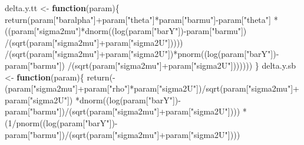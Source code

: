 \documentclass[
]{book}
\newenvironment{Shaded}{\begin{snugshade}}{\end{snugshade}}
\newcommand{\ControlFlowTok}[1]{\textcolor[rgb]{0.13,0.29,0.53}{\textbf{#1}}}
\newcommand{\DecValTok}[1]{\textcolor[rgb]{0.00,0.00,0.81}{#1}}
\newcommand{\FunctionTok}[1]{\textcolor[rgb]{0.00,0.00,0.00}{#1}}
\newcommand{\NormalTok}[1]{#1}
\newcommand{\OtherTok}[1]{\textcolor[rgb]{0.56,0.35,0.01}{#1}}
\newcommand{\SpecialCharTok}[1]{\textcolor[rgb]{0.00,0.00,0.00}{#1}}
\newcommand{\StringTok}[1]{\textcolor[rgb]{0.31,0.60,0.02}{#1}}
\theoremstyle{definition}
\theoremstyle{definition}
\theoremstyle{definition}
\theoremstyle{definition}
\theoremstyle{remark}
\begin{document}
\begin{Shaded}
\begin{Highlighting}[]
\NormalTok{delta.y.tt }\OtherTok{\textless{}{-}} \ControlFlowTok{function}\NormalTok{(param)\{}
  \FunctionTok{return}\NormalTok{(param[}\StringTok{"baralpha"}\NormalTok{]}\SpecialCharTok{+}\NormalTok{param[}\StringTok{"theta"}\NormalTok{]}\SpecialCharTok{*}\NormalTok{param[}\StringTok{"barmu"}\NormalTok{]}\SpecialCharTok{{-}}\NormalTok{param[}\StringTok{"theta"}\NormalTok{]}
         \SpecialCharTok{*}\NormalTok{((param[}\StringTok{"sigma2mu"}\NormalTok{]}\SpecialCharTok{*}\FunctionTok{dnorm}\NormalTok{((}\FunctionTok{log}\NormalTok{(param[}\StringTok{"barY"}\NormalTok{])}\SpecialCharTok{{-}}\NormalTok{param[}\StringTok{"barmu"}\NormalTok{])}
                                    \SpecialCharTok{/}\NormalTok{(}\FunctionTok{sqrt}\NormalTok{(param[}\StringTok{"sigma2mu"}\NormalTok{]}\SpecialCharTok{+}\NormalTok{param[}\StringTok{"sigma2U"}\NormalTok{]))))}
           \SpecialCharTok{/}\NormalTok{(}\FunctionTok{sqrt}\NormalTok{(param[}\StringTok{"sigma2mu"}\NormalTok{]}\SpecialCharTok{+}\NormalTok{param[}\StringTok{"sigma2U"}\NormalTok{])}\SpecialCharTok{*}\FunctionTok{pnorm}\NormalTok{((}\FunctionTok{log}\NormalTok{(param[}\StringTok{"barY"}\NormalTok{])}\SpecialCharTok{{-}}\NormalTok{param[}\StringTok{"barmu"}\NormalTok{])}
                                                            \SpecialCharTok{/}\NormalTok{(}\FunctionTok{sqrt}\NormalTok{(param[}\StringTok{"sigma2mu"}\NormalTok{]}\SpecialCharTok{+}\NormalTok{param[}\StringTok{"sigma2U"}\NormalTok{]))))))}
\NormalTok{\}}
\NormalTok{delta.y.sb }\OtherTok{\textless{}{-}} \ControlFlowTok{function}\NormalTok{(param)\{}
  \FunctionTok{return}\NormalTok{(}\SpecialCharTok{{-}}\NormalTok{(param[}\StringTok{"sigma2mu"}\NormalTok{]}\SpecialCharTok{+}\NormalTok{param[}\StringTok{"rho"}\NormalTok{]}\SpecialCharTok{*}\NormalTok{param[}\StringTok{"sigma2U"}\NormalTok{])}\SpecialCharTok{/}\FunctionTok{sqrt}\NormalTok{(param[}\StringTok{"sigma2mu"}\NormalTok{]}\SpecialCharTok{+}\NormalTok{param[}\StringTok{"sigma2U"}\NormalTok{])}
         \SpecialCharTok{*}\FunctionTok{dnorm}\NormalTok{((}\FunctionTok{log}\NormalTok{(param[}\StringTok{"barY"}\NormalTok{])}\SpecialCharTok{{-}}\NormalTok{param[}\StringTok{"barmu"}\NormalTok{])}\SpecialCharTok{/}\NormalTok{(}\FunctionTok{sqrt}\NormalTok{(param[}\StringTok{"sigma2mu"}\NormalTok{]}\SpecialCharTok{+}\NormalTok{param[}\StringTok{"sigma2U"}\NormalTok{])))}
         \SpecialCharTok{*}\NormalTok{(}\DecValTok{1}\SpecialCharTok{/}\FunctionTok{pnorm}\NormalTok{((}\FunctionTok{log}\NormalTok{(param[}\StringTok{"barY"}\NormalTok{])}\SpecialCharTok{{-}}\NormalTok{param[}\StringTok{"barmu"}\NormalTok{])}\SpecialCharTok{/}\NormalTok{(}\FunctionTok{sqrt}\NormalTok{(param[}\StringTok{"sigma2mu"}\NormalTok{]}\SpecialCharTok{+}\NormalTok{param[}\StringTok{"sigma2U"}\NormalTok{])))}

\end{Highlighting}
\end{Shaded}
\end{document}
